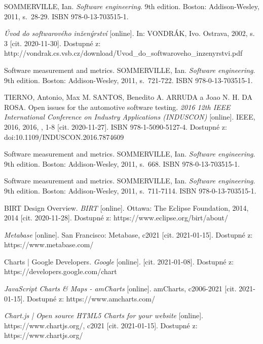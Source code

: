 \documentclass[czech,master]{diploma}
\begin{document}
\begin{thebibliography}{43}

SOMMERVILLE, Ian. \textit{Software engineering}. 9th edition. Boston: Addison-Wesley, 2011, s.~28-29. ISBN 978-0-13-703515-1.

\textit{Úvod do softwarového inženýrství} [online]. In: VONDRÁK, Ivo. Ostrava, 2002, s. 3 [cit. 2020-11-30]. Dostupné z: http://vondrak.cs.vsb.cz/download/Uvod\_do\_softwaroveho\_inzenyrstvi.pdf

Software measurement and metrics. SOMMERVILLE, Ian. \textit{Software engineering}. 9th edition. Boston: Addison-Wesley, 2011, s.~721-722. ISBN 978-0-13-703515-1.


TIERNO, Antonio, Max M. SANTOS, Benedito A. ARRUDA a Joao N. H. DA ROSA. Open issues for the automotive software testing. \textit{2016 12th IEEE International Conference on Industry Applications (INDUSCON)} [online]. IEEE, 2016, 2016, , 1-8 [cit. 2020-11-27]. ISBN 978-1-5090-5127-4. Dostupné z: doi:10.1109/INDUSCON.2016.7874609

Software measurement and metrics. SOMMERVILLE, Ian. \textit{Software engineering}. 9th edition. Boston: Addison-Wesley, 2011, s.~668. ISBN 978-0-13-703515-1.


Software measurement and metrics. SOMMERVILLE, Ian. \textit{Software engineering}. 9th edition. Boston: Addison-Wesley, 2011, s.~711-7114. ISBN 978-0-13-703515-1.

BIRT Design Overview. \textit{BIRT} [online]. Ottawa: The Eclipse Foundation, 2014, 2014 [cit. 2020-11-28]. Dostupné z: https://www.eclipse.org/birt/about/

\textit{Metabase} [online]. San Francisco: Metabase, c2021 [cit. 2021-01-15]. Dostupné z: https://www.metabase.com/

Charts | Google Developers. \textit{Google} [online]. [cit. 2021-01-08]. Dostupné z: https://developers.google.com/chart

\textit{JavaScript Charts \& Maps - amCharts} [online]. amCharts, c2006-2021 [cit. 2021-01-15]. Dostupné z: https://www.amcharts.com/

\textit{Chart.js | Open source HTML5 Charts for your website} [online]. https://www.chartjs.org/, c2021 [cit. 2021-01-15]. Dostupné z: https://www.chartjs.org/


\end{thebibliography}
\end{document}
